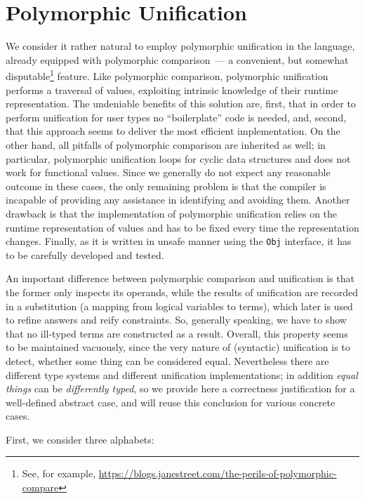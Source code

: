 \section{Polymorphic Unification}
\label{sec:unification}

We consider it rather natural to employ polymorphic unification in the language, already equipped 
with polymorphic comparison~--- a convenient, but somewhat disputable\footnote{See, for example, 
\url{https://blogs.janestreet.com/the-perils-of-polymorphic-compare}} feature. Like polymorphic comparison, 
polymorphic unification performs a traversal of values, exploiting intrinsic knowledge of their runtime 
representation. The undeniable benefits of this solution are, first, that in order to perform unification 
for user types no ``boilerplate'' code is needed, and, second, that this approach seems to deliver the
most efficient implementation. On the other hand, all pitfalls of polymorphic comparison are inherited as 
well; in particular, polymorphic unification loops for cyclic data structures and does not work for functional 
values. Since we generally do not expect any reasonable outcome in these cases, the only remaining problem is that
the compiler is incapable of providing any assistance in identifying and avoiding them. Another drawback is that 
the implementation of polymorphic unification relies on the runtime representation of values and has to be fixed 
every time the representation changes.  Finally, as it is written in unsafe manner using the \lstinline{Obj} interface, 
it has to be carefully developed and tested.

An important difference between polymorphic comparison and unification is that the former only inspects its operands, 
while the results of unification are recorded in a substitution (a mapping from logical variables to terms), which 
later is used to refine answers and reify constraints. So, generally speaking, we have to show that no ill-typed 
terms are constructed as a result. Overall, this property seems to be maintained vacuously, since the very 
nature of (syntactic) unification is to detect, whether some thing can be considered equal. Nevertheless there are
different type systems and different unification implementations; in addition \emph{equal things} can be
\emph{differently typed}, so we provide here a correctness justification for a well-defined abstract case, and will 
reuse this conclusion for various concrete cases.

First, we consider three alphabets:


